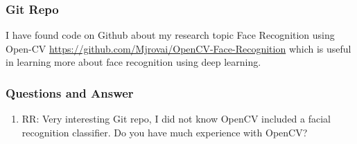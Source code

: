  \subsubsection{Git Repo}
I have found code on Github about my research topic Face Recognition using Open-CV \url{https://github.com/Mjrovai/OpenCV-Face-Recognition} which is useful in learning more about face recognition using deep learning.


\subsubsection{Questions and Answer} 
\begin{enumerate}
	\item RR: Very interesting Git repo, I did not know OpenCV included a facial recognition classifier. Do you have much experience with OpenCV?

\end{enumerate}